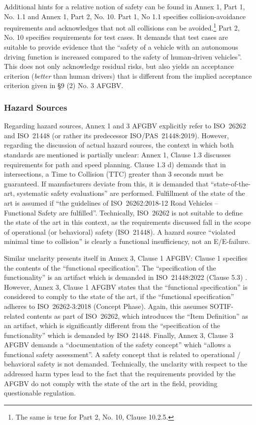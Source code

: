 Additional hints for a relative notion of safety can be found in Annex 1, Part 1, No. 1.1 and Annex 1, Part 2, No. 10.
Part 1, No 1.1 specifies collision-avoidance requirements and acknowledges that not all collisions can be avoided.\footnote{The same is true for Part 2, No. 10, Clause 10.2.5.}
Part 2, No. 10 specifies requirements for test cases.
It demands that test cases are suitable to provide evidence that the ``safety of a vehicle with an autonomous driving function is increased compared to the safety of human-driven vehicles''.
This does not only acknowledge residual risks, but also yields an acceptance criterion (\emph{better} than human drivers) that is different from the implied acceptance criterion given in §9 (2) No. 3 AFGBV.

\subsubsection{Hazard Sources}
Regarding hazard sources, Annex 1 and 3 AFGBV explicitly refer to ISO~26262 and ISO~21448 (or rather its predecessor ISO/PAS~21448:2019).
However, regarding the discussion of actual hazard sources, the context in which both standards are mentioned is partially unclear:
Annex 1, Clause 1.3 discusses requirements for path and speed planning.
Clause 1.3 d) demands that in intersections, a Time to Collision (TTC) greater than 3 seconds must be guaranteed.
If manufacturers deviate from this, it is demanded that ``state-of-the-art, systematic safety evaluations'' are performed.
Fulfillment of the state of the art is assumed if ``the guidelines of ISO~26262:2018-12 Road Vehicles -- Functional Safety are fulfilled''.
Technically, ISO~26262 is not suitable to define the state of the art in this context, as the requirements discussed fall in the scope of operational (or behavioral) safety (ISO~21448).
A hazard source ``violated minimal time to collision'' is clearly a functional insufficiency, not an E/E-failure.

Similar unclarity presents itself in Annex 3, Clause 1 AFGBV: 
Clause 1 specifies the contents of the ``functional specification''.
The ``specification of the functionality'' is an artifact which is demanded in ISO~21448:2022 (Clause 5.3) \parencite{iso21448}.
However, Annex 3, Clause 1 AFGBV states that the ``functional specification'' is considered to comply to the state of the art, if the ``functional specification'' adheres to ISO~26262-3:2018 (Concept Phase).
Again, this assumes SOTIF-related contents as part of ISO~26262, which introduces the ``Item Definition'' as an artifact, which is significantly different from the ``specification of the functionality'' which is demanded by ISO~21448.
Finally, Annex 3, Clause 3 AFGBV demands a ``documentation of the safety concept'' which ``allows a functional safety assessment''.
A safety concept that is related to operational / behavioral safety is not demanded.
Technically, the unclarity with respect to the addressed harm types lead to the fact that the requirements provided by the AFGBV do not comply with the state of the art in the field, providing questionable regulation.

